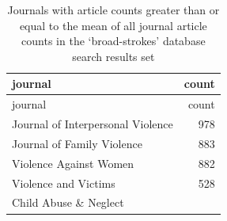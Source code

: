 \documentclass[]{tufte-handout}
\begin{document}
\begin{longtable}[]{@{}lr@{}}
\caption{Journals with article counts greater than or equal to the mean
of all journal article counts in the `broad-strokes' database search
results set}\tabularnewline
\toprule
\begin{minipage}[b]{0.60\columnwidth}\raggedright\strut
journal\strut
\end{minipage} & \begin{minipage}[b]{0.09\columnwidth}\raggedleft\strut
count\strut
\end{minipage}\tabularnewline
\midrule
\endfirsthead
\toprule
\begin{minipage}[b]{0.60\columnwidth}\raggedright\strut
journal\strut
\end{minipage} & \begin{minipage}[b]{0.09\columnwidth}\raggedleft\strut
count\strut
\end{minipage}\tabularnewline
\midrule
\endhead
\begin{minipage}[t]{0.60\columnwidth}\raggedright\strut
Journal of Interpersonal Violence\strut
\end{minipage} & \begin{minipage}[t]{0.09\columnwidth}\raggedleft\strut
978\strut
\end{minipage}\tabularnewline
\begin{minipage}[t]{0.60\columnwidth}\raggedright\strut
Journal of Family Violence\strut
\end{minipage} & \begin{minipage}[t]{0.09\columnwidth}\raggedleft\strut
883\strut
\end{minipage}\tabularnewline
\begin{minipage}[t]{0.60\columnwidth}\raggedright\strut
Violence Against Women\strut
\end{minipage} & \begin{minipage}[t]{0.09\columnwidth}\raggedleft\strut
882\strut
\end{minipage}\tabularnewline
\begin{minipage}[t]{0.60\columnwidth}\raggedright\strut
Violence and Victims\strut
\end{minipage} & \begin{minipage}[t]{0.09\columnwidth}\raggedleft\strut
528\strut
\end{minipage}\tabularnewline
\begin{minipage}[t]{0.60\columnwidth}\raggedright\strut
Child Abuse \& Neglect\strut
\end{minipage} & \begin{minipage}[t]{0.09\columnwidth}\raggedleft\strut

\end{minipage}
\end{longtable}
\end{document}

